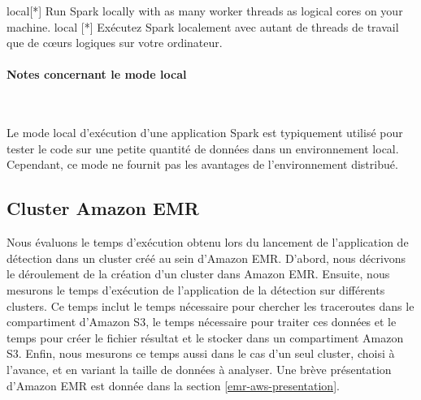 local[*] Run Spark locally with as many worker threads as logical cores on your machine.
local [*] Exécutez Spark localement avec autant de threads de travail que de c\oe{}urs logiques sur votre ordinateur.


\begin{table}[h]
\end{table}

\paragraph{Notes concernant le mode local}~

Le mode local d'exécution d'une application Spark est typiquement utilisé pour tester le code sur une petite quantité de données dans un environnement local. Cependant, ce mode  ne fournit pas les avantages de l'environnement distribué. 

\subsection{Cluster Amazon EMR}

Nous évaluons le temps d'exécution obtenu lors du lancement de l'application de détection dans un cluster créé au sein d'Amazon EMR. D'abord, nous  décrivons le déroulement de la création d'un cluster dans Amazon EMR. Ensuite, nous mesurons le temps d'exécution de l'application de la détection sur différents clusters. Ce temps inclut le temps nécessaire  pour chercher les traceroutes dans le compartiment d'Amazon S3, le temps nécessaire pour traiter ces données et  le temps pour créer le fichier résultat et le stocker dans un compartiment Amazon S3. Enfin, nous mesurons ce temps  aussi dans le cas d'un seul cluster, choisi à l'avance, et en variant la taille  de données à analyser. Une brève présentation d'Amazon EMR est donnée dans la section \ref{emr-aws-presentation}.

